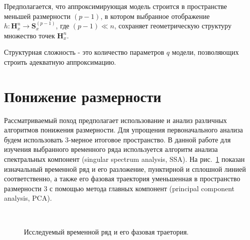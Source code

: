 \documentclass[12pt,twoside]{article}
\begin{document}
\vspace{\baselineskip}

Предполагается, что аппроксимирующая модель строится в пространстве меньшей размерности $(p-1)$, в котором выбранное отображение $h: \mathbf{H}_{x}^{n} \xrightarrow{} \mathbf{S}_x^{(p-1)} $, где $(p-1)\ll n$, сохраняет геометрическую структуру множество точек $\mathbf{H}_{x}^{n}$. 
\vspace{\baselineskip}

\begin{Def}
Структурная сложность - это количество параметров $q$ модели, позволяющих строить адекватную аппроксимацию.
\end{Def}
\newpage
\section{Понижение размерности}
Рассматриваемый поход предполагает использование и анализ различных алгоритмов понижения размерности.
Для упрощения первоначального анализа будем использовать 3-мерное итоговое пространство.
В данной работе для изучения выбранного временного ряда используется алгоритм анализа спектральных компонент (singular spectrum analysis, SSA).
На рис.~\ref{fg:initial_traj} показан изначальный временной ряд и его разложение, пунктирной и сплошной линией соответственно, а также его фазовая траектория уменьшенная в пространство размерности 3 с помощью метода главных компонент (principal component analysis, PCA).
\begin{figure}[h]
\centering
  \\
\caption{Исследуемый временной ряд и его фазовая траетория. }
\label{fg:initial_traj}
\end{figure}
\end{document}
